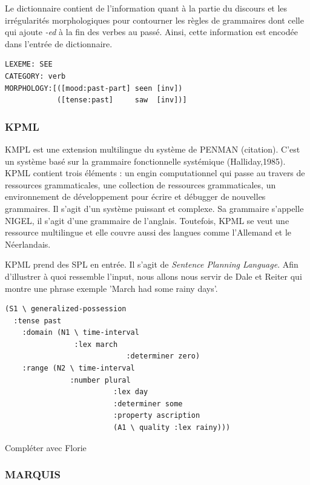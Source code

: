 Le dictionnaire contient de l'information quant à la partie du discours et les irrégularités morphologiques pour contourner les règles de grammaires dont celle qui ajoute \emph{-ed} à la fin des verbes au passé. Ainsi, cette information est encodée dans l'entrée de dictionnaire.

\begin{lstlisting}[language=Xml, caption=Entrée de dictionnaire]
LEXEME: SEE
CATEGORY: verb
MORPHOLOGY:[([mood:past-part] seen [inv])
            ([tense:past]     saw  [inv])]
\end{lstlisting}


\subsubsection{KPML}
KMPL\citep{BatemanEnablingTechnologyMultilingual1997} est une extension multilingue du système de PENMAN (citation). C'est un système basé sur la grammaire fonctionnelle systémique (Halliday,1985). KPML contient trois éléments : un engin computationnel qui passe au travers de ressources grammaticales, une collection de ressources grammaticales, un environnement de développement pour écrire et débugger de nouvelles grammaires. Il s'agit d'un système puissant et complexe. Sa grammaire s'appelle NIGEL, il s'agit d'une grammaire de l'anglais. Toutefois, KPML se veut une ressource multilingue et elle couvre aussi des langues comme l'Allemand et le Néerlandais.

KPML prend des SPL en entrée. Il s'agit de \emph{Sentence Planning Language}. Afin d'illustrer à quoi ressemble l'input, nous allons nous servir de Dale et Reiter qui montre une phrase exemple 'March had some rainy days'.
\begin{lstlisting}[language=Xml, caption=SPL: input de KPML]
(S1 \ generalized-possession
  :tense past 
	:domain (N1 \ time-interval
	            :lex march
							:determiner zero)
	:range (N2 \ time-interval
	           :number plural
						 :lex day
						 :determiner some
						 :property ascription
						 (A1 \ quality :lex rainy)))
\end{lstlisting}
Compléter avec Florie

\subsubsection{MARQUIS}
\citep{WannerMARQUISGENERATIONUSERTAILORED2010}

